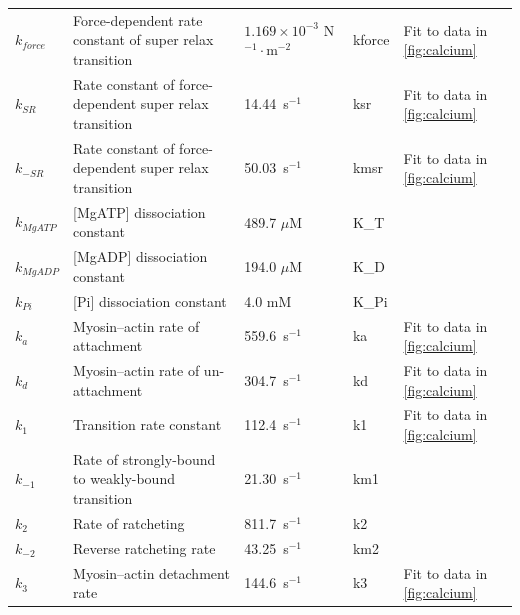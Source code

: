 \documentclass[fleqn,10pt]{physiome}
\begin{document}
\begin{table}[!htb]
\begin{supertabular}{p{1.4cm} p{4.4cm} p{1.8cm} p{2.0cm} p{2.0cm}}
$k_{force}$ & 
 Force-dependent  rate constant of super relax transition  & 
  $1.169 \times 10^{-3}$ N$^{-1}\cdot$m$^{-2}$ & kforce &
Fit to data in \autoref{fig:calcium}  \\

$k_{SR}$ & 
Rate constant of force-dependent super relax transition  & 
14.44~s$^{-1}$ & 
ksr &
Fit to data in \autoref{fig:calcium}  \\

$k_{-SR}$ & 
Rate constant of force-dependent super relax transition  & 
50.03~s$^{-1}$ & 
kmsr &
Fit to data in \autoref{fig:calcium}  \\

$k_{MgATP}$ & 
[MgATP] dissociation constant  & 
489.7 $\mu$M &
K\_T &
\cite{Tewari2016b} \\

$k_{MgADP}$ & 
[MgADP] dissociation constant  & 
194.0 $\mu$M &
K\_D &
\cite{Tewari2016b} \\

$k_{Pi}$ & 
[Pi] dissociation constant  & 
4.0 mM &
K\_Pi &
\cite{Tewari2016b} \\

$k_a$ & 
Myosin–actin rate of attachment  & 
559.6~s$^{-1}$ & 
ka &
Fit to data in \autoref{fig:calcium}  \\

$k_d$ & 
Myosin–actin rate of un-attachment  & 
304.7~s$^{-1}$ & 
kd &
Fit to data in \autoref{fig:calcium}  \\

$k_1$ & 
 Transition rate constant  & 
112.4~s$^{-1}$ & 
k1 &
Fit to data in \autoref{fig:calcium}  \\

$k_{-1}$ & 
Rate of strongly-bound to weakly-bound transition  & 
21.30~s$^{-1}$ & 
km1 & 
\cite{Tewari2016b} \\

$k_2$ & 
Rate of ratcheting  & 
811.7~s$^{-1}$ & 
k2 & 
\cite{Tewari2016b} \\

$k_{-2}$ & 
Reverse ratcheting rate  & 
43.25~s$^{-1}$ & 
km2 & 
\cite{Tewari2016b} \\

$k_3$ & 
 Myosin–actin  detachment rate  & 
144.6~s$^{-1}$ & 
k3 &
Fit to data in \autoref{fig:calcium}  \\

\bottomrule 
\end{supertabular}
\end{table}
\end{document}
